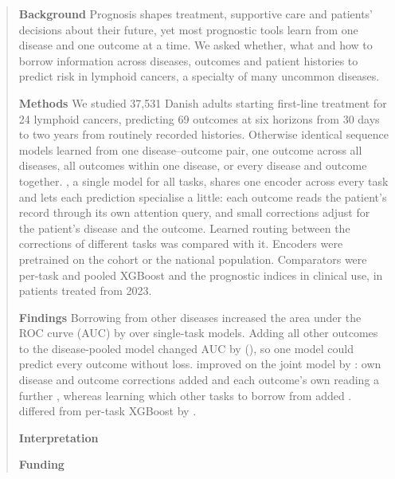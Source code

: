 \begin{abstract}
\textbf{Background} Prognosis shapes treatment, supportive care and patients'
decisions about their future, yet most prognostic tools learn from one disease
and one outcome at a time. We asked whether, what and how to borrow information
across diseases, outcomes and patient histories to predict risk in lymphoid
cancers, a specialty of many uncommon diseases.

\textbf{Methods} We studied 37,531 Danish adults starting first-line treatment
for 24 lymphoid cancers, predicting 69 outcomes at six horizons from 30 days to
two years from routinely recorded histories. Otherwise identical sequence models
learned from one disease--outcome pair, one outcome across all diseases, all
outcomes within one disease, or every disease and outcome together. \opera{}, a
single model for all tasks, shares one encoder across every task and lets each
prediction specialise a little: each outcome reads the patient's record through
its own attention query, and small corrections adjust for the patient's disease
and the outcome. Learned routing between the corrections of different tasks was
compared with it. Encoders were
pretrained on the cohort or the national population. Comparators were per-task
and pooled XGBoost and the prognostic indices in clinical use, in patients
treated from 2023.

\textbf{Findings} Borrowing from other diseases increased the area under the
ROC curve (AUC) by  over single-task models. Adding all other
outcomes to the disease-pooled model changed AUC by 
(), so one model could predict every outcome without
loss. \opera{} improved on the joint model by : own disease
and outcome corrections added  and each outcome's own
reading a further , whereas learning which other
tasks to borrow from added . \opera{} differed from
per-task XGBoost by . 

\textbf{Interpretation} 

\textbf{Funding} 
\end{abstract}

